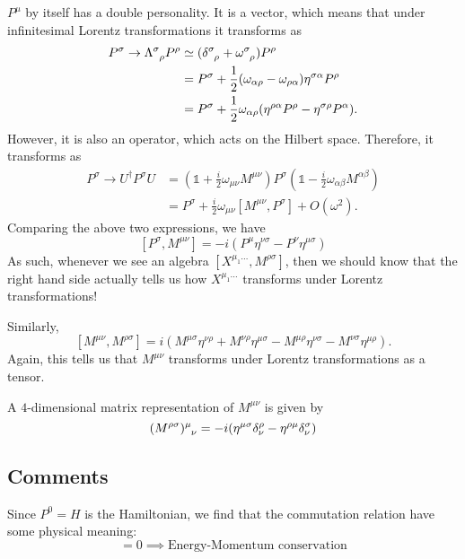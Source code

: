 $P^{\mu}$ by itself has a double personality. It is a vector, which means that under infinitesimal Lorentz transformations it transforms as
\begin{align}
  P^{\sigma} \to \Lambda\indices{^{\sigma}_{\rho}} P^{\rho} &\simeq (\delta\indices{^{\sigma}_{\rho}} + \omega\indices{^{\sigma}_{\rho}}) P^{\rho} \\
  &= P^{\sigma} + \frac{1}{2} (\omega_{\alpha\rho} - \omega_{\rho\alpha}) \eta^{\sigma\alpha} P^{\rho} \\
  &= P^{\sigma} + \frac{1}{2} \omega_{\alpha\rho} (\eta^{\rho\alpha} P^{\rho} - \eta^{\sigma\rho} P^{\alpha}).
\end{align} 
However, it is also an operator, which acts on the Hilbert space.
Therefore, it transforms as
\begin{align}
  P^{\sigma} \to U^{\dagger} P^{\sigma} U &= (\mathbb{1} + \frac{i}{2} \omega_{\mu\nu} M^{\mu\nu}) P^{\sigma} (\mathbb{1} - \frac{i}{2} \omega_{\alpha \beta} M^{\alpha \beta}) \\
					  &= P^{\sigma} +\frac{i}{2} \omega_{\mu\nu} [M^{\mu\nu}, P^{\sigma}] + O(\omega^2).
\end{align}
Comparing the above two expressions, we have
\begin{equation}
  \boxed{[P^{\sigma}, M^{\mu\nu}] = -i (P^{\mu} \eta^{\nu\sigma} - P^{\nu} \eta^{\mu\sigma})}
\end{equation}
As such, whenever we see an algebra $[X^{\mu_1 \dots}, M^{\rho\sigma}]$, then we should know that the right hand side actually tells us how $X^{\mu_1 \dots}$ transforms under Lorentz transformations!

Similarly, 
\begin{equation}
  \boxed{[M^{\mu\nu}, M^{\rho\sigma}] = i (M^{\mu\sigma} \eta^{\nu\rho} + M^{\nu\rho} \eta^{\mu\sigma} - M^{\mu\rho} \eta^{\nu\sigma} - M^{\nu\sigma} \eta^{\mu\rho})}.
\end{equation}
Again, this tells us that $M^{\mu\nu}$ transforms under Lorentz transformations as a tensor.

\begin{example}[]
  A $4$-dimensional matrix representation of $M^{\mu\nu}$ is given by
  \begin{equation}
    (M^{\rho\sigma})\indices{^{\mu}_{\nu}} = -i (\eta^{\mu\sigma} \delta^{\rho}_{\nu} - \eta^{\rho\mu} \delta^{\sigma}_{\nu})
  \end{equation}
\end{example}

\subsection*{Comments}%

Since $P^0 = H$ is the Hamiltonian, we find that the commutation relation have some physical meaning:
\begin{equation}
  [P^0, P^{\mu}] = 0 \implies \text{Energy-Momentum conservation}
\end{equation}
